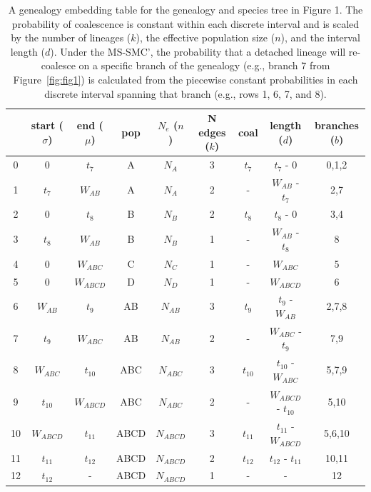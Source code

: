 \documentclass[11pt]{article}
\begin{document}
\begin{table}[t]
\centering
\caption{
	A genealogy embedding table for the genealogy and species tree in Figure 1. 
	The probability of coalescence is constant within each discrete interval 
	and is scaled by the number of lineages ($k$), the effective population size ($n$), 
	and the interval length ($d$).
	Under the MS-SMC', the probability that a detached lineage will re-coalesce
	on a specific branch of the genealogy (e.g., branch 7 from Figure~\ref{fig:fig1})
	is calculated from the piecewise constant probabilities in each 
	discrete interval spanning that branch (e.g., rows 1, 6, 7, and 8).
}
\begin{tabular}[t]{ |c|c|c|c|c|c|c|c|c| }
	\toprule
	 & start ($\sigma$)  & end ($\mu$)  & pop & $N_e$ ($n$)  & N edges ($k$) & coal  & length ($d$) & branches ($b$) \\
	\midrule
	0 & 0          & $t_7$      & A   & $N_A$     & 3 & $t_7$    & $t_7$ - 0            & 0,1,2 \\
	1 & $t_7$      & $W_{AB}$   & A   & $N_A$     & 2 & -        & $W_{AB}$ - $t_7$     & 2,7   \\	
	2 & 0          & $t_8$      & B   & $N_B$     & 2 & $t_8$    & $t_8$ - 0            & 3,4   \\ 
	3 & $t_8$      & $W_{AB}$   & B   & $N_B$     & 1 & -        & $W_{AB}$ - $t_8$     & 8     \\
	4 & 0          & $W_{ABC}$  & C   & $N_C$     & 1 & -        & $W_{ABC}$            & 5     \\
	5 & 0          & $W_{ABCD}$ & D   & $N_D$     & 1 & -        & $W_{ABCD}$           & 6     \\
	6 & $W_{AB}$   & $t_9$      & AB  & $N_{AB}$  & 3 & $t_9$    & $t_9$ - $W_{AB}$     & 2,7,8 \\
	7 & $t_9$      & $W_{ABC}$  & AB  & $N_{AB}$  & 2 & -        & $W_{ABC}$ - $t_9$    & 7,9   \\
	8 & $W_{ABC}$  & $t_{10}$   & ABC & $N_{ABC}$ & 3 & $t_{10}$ & $t_{10}$ - $W_{ABC}$ & 5,7,9  \\
	9 & $t_{10}$   & $W_{ABCD}$ & ABC & $N_{ABC}$ & 2 & -        & $W_{ABCD}$ - $t_{10}$ & 5,10 \\
	10 & $W_{ABCD}$ & $t_{11}$  & ABCD & $N_{ABCD}$ & 3 & $t_{11}$ & $t_{11}$ - $W_{ABCD}$ & 5,6,10 \\
	11 & $t_{11}$  & $t_{12}$   & ABCD & $N_{ABCD}$ & 2 & $t_{12}$ & $t_{12}$ - $t_{11}$ & 10,11 \\
	12 & $t_{12}$  & -          & ABCD & $N_{ABCD}$ & 1 & -        & -                   & 12    \\	
	\bottomrule
\end{tabular}
\label{tab:table-1} 
\end{table}
\end{document}
